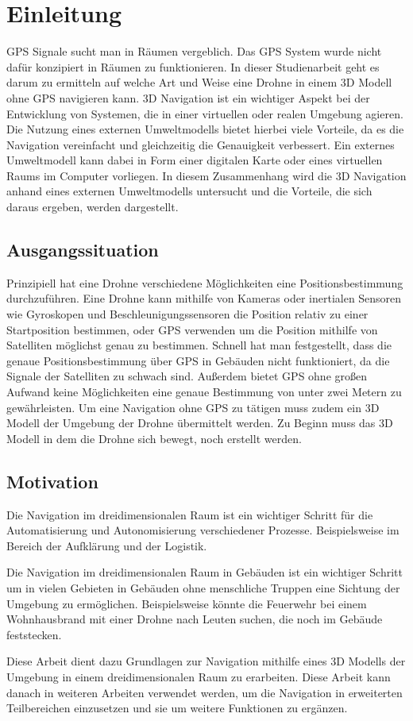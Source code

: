 \chapter{Einleitung}

GPS Signale sucht man in Räumen vergeblich. Das GPS System wurde nicht dafür konzipiert in Räumen zu funktionieren.
In dieser Studienarbeit geht es darum zu ermitteln auf welche Art und Weise eine Drohne in einem 3D Modell ohne GPS navigieren kann.
3D Navigation ist ein wichtiger Aspekt bei der Entwicklung von Systemen, die in einer virtuellen oder realen Umgebung agieren. Die Nutzung eines externen Umweltmodells bietet hierbei viele Vorteile, da es die Navigation vereinfacht und gleichzeitig die Genauigkeit verbessert. Ein externes Umweltmodell kann dabei in Form einer digitalen Karte oder eines virtuellen Raums im Computer vorliegen. In diesem Zusammenhang wird die 3D Navigation anhand eines externen Umweltmodells untersucht und die Vorteile, die sich daraus ergeben, werden dargestellt.



\section{Ausgangssituation}

Prinzipiell hat eine Drohne verschiedene Möglichkeiten eine Positionsbestimmung durchzuführen.
Eine Drohne kann mithilfe von Kameras oder inertialen Sensoren wie Gyroskopen und Beschleunigungssensoren die Position relativ zu einer Startposition bestimmen, oder \ac{GPS} verwenden um die Position mithilfe von Satelliten möglichst genau zu bestimmen.
Schnell hat man festgestellt, dass die genaue Positionsbestimmung über GPS in Gebäuden nicht funktioniert, da die Signale der Satelliten zu schwach sind. Außerdem bietet \ac{GPS} ohne großen Aufwand keine Möglichkeiten eine genaue Bestimmung von unter zwei Metern zu gewährleisten.
Um eine Navigation ohne GPS zu tätigen muss zudem ein 3D Modell der Umgebung der Drohne übermittelt werden.
Zu Beginn muss das 3D Modell in dem die Drohne sich bewegt, noch erstellt werden.


\section{Motivation}

Die Navigation im dreidimensionalen Raum ist ein wichtiger Schritt für die Automatisierung und Autonomisierung verschiedener Prozesse. Beispielsweise im Bereich der Aufklärung und der Logistik.

Die Navigation im dreidimensionalen Raum in Gebäuden ist ein wichtiger Schritt um in vielen Gebieten in Gebäuden ohne menschliche Truppen eine Sichtung der Umgebung zu ermöglichen. Beispielsweise könnte die Feuerwehr bei einem Wohnhausbrand mit einer Drohne nach Leuten suchen, die noch im Gebäude feststecken.

Diese Arbeit dient dazu Grundlagen zur Navigation mithilfe eines 3D Modells der Umgebung in einem dreidimensionalen Raum zu erarbeiten. Diese Arbeit kann danach in weiteren Arbeiten verwendet werden, um die Navigation in erweiterten Teilbereichen einzusetzen und sie um weitere Funktionen zu ergänzen.



